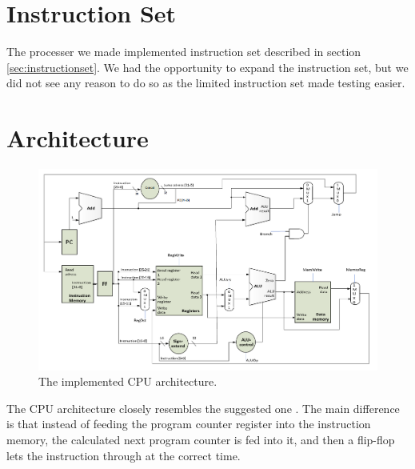 \section{Instruction Set}

The processer we made implemented instruction set described in section \ref{sec:instructionset}.
We had the opportunity to expand the instruction set, but we did not see any reason to do so as the limited instruction set made testing easier.

\section{Architecture}

\begin{figure}[ht]
    \centering
    \includegraphics[scale=0.3]{figures/cpu2.png}
    \caption{\label{fig:cpuArchitecture}The implemented CPU architecture.} 
\end{figure}

The CPU architecture closely resembles the suggested one \cite[p.115]{lab-compendium}.
The main difference is that instead of feeding the program counter register into the instruction memory, 
the calculated next program counter is fed into it, and then a flip-flop lets the instruction through at the correct time.


